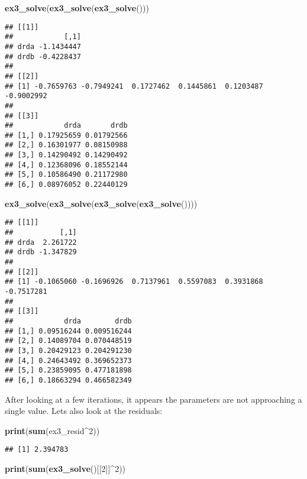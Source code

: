 \documentclass[
]{article}
\newenvironment{Shaded}{\begin{snugshade}}{\end{snugshade}}
\newcommand{\DecValTok}[1]{\textcolor[rgb]{0.00,0.00,0.81}{#1}}
\newcommand{\KeywordTok}[1]{\textcolor[rgb]{0.13,0.29,0.53}{\textbf{#1}}}
\newcommand{\NormalTok}[1]{#1}
\newcommand{\OperatorTok}[1]{\textcolor[rgb]{0.81,0.36,0.00}{\textbf{#1}}}
\begin{document}
\begin{Shaded}
\begin{Highlighting}[]
\KeywordTok{ex3\_solve}\NormalTok{(}\KeywordTok{ex3\_solve}\NormalTok{(}\KeywordTok{ex3\_solve}\NormalTok{()))}
\end{Highlighting}
\end{Shaded}

\begin{verbatim}
## [[1]]
##            [,1]
## drda -1.1434447
## drdb -0.4228437
## 
## [[2]]
## [1] -0.7659763 -0.7949241  0.1727462  0.1445861  0.1203487 -0.9002992
## 
## [[3]]
##            drda       drdb
## [1,] 0.17925659 0.01792566
## [2,] 0.16301977 0.08150988
## [3,] 0.14290492 0.14290492
## [4,] 0.12368096 0.18552144
## [5,] 0.10586490 0.21172980
## [6,] 0.08976052 0.22440129
\end{verbatim}

\begin{Shaded}
\begin{Highlighting}[]
\KeywordTok{ex3\_solve}\NormalTok{(}\KeywordTok{ex3\_solve}\NormalTok{(}\KeywordTok{ex3\_solve}\NormalTok{(}\KeywordTok{ex3\_solve}\NormalTok{())))}
\end{Highlighting}
\end{Shaded}

\begin{verbatim}
## [[1]]
##           [,1]
## drda  2.261722
## drdb -1.347829
## 
## [[2]]
## [1] -0.1065060 -0.1696926  0.7137961  0.5597083  0.3931868 -0.7517281
## 
## [[3]]
##            drda        drdb
## [1,] 0.09516244 0.009516244
## [2,] 0.14089704 0.070448519
## [3,] 0.20429123 0.204291230
## [4,] 0.24643492 0.369652373
## [5,] 0.23859095 0.477181898
## [6,] 0.18663294 0.466582349
\end{verbatim}

After looking at a few iterations, it appears the parameters are not
approaching a single value. Lets also look at the residuals:

\begin{Shaded}
\begin{Highlighting}[]
\KeywordTok{print}\NormalTok{(}\KeywordTok{sum}\NormalTok{(ex3\_resid}\OperatorTok{\^{}}\DecValTok{2}\NormalTok{))}
\end{Highlighting}
\end{Shaded}

\begin{verbatim}
## [1] 2.394783
\end{verbatim}

\begin{Shaded}
\begin{Highlighting}[]
\KeywordTok{print}\NormalTok{(}\KeywordTok{sum}\NormalTok{(}\KeywordTok{ex3\_solve}\NormalTok{()[[}\DecValTok{2}\NormalTok{]]}\OperatorTok{\^{}}\DecValTok{2}\NormalTok{))}
\end{Highlighting}
\end{Shaded}
\end{document}
